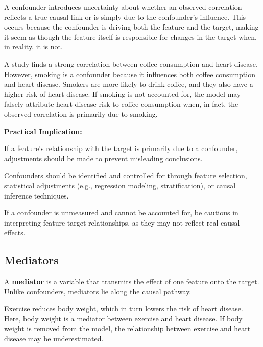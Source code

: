 \documentclass[12pt,openany, draft]{book}
\begin{document}
A confounder introduces uncertainty about whether an observed correlation reflects a true causal link or is simply due to the confounder’s influence. This occurs because the confounder is driving both the feature and the target, making it seem as though the feature itself is responsible for changes in the target when, in reality, it is not.

\begin{examplebox}
A study finds a strong correlation between coffee consumption and heart disease. However, smoking is a confounder because it influences both coffee consumption and heart disease. Smokers are more likely to drink coffee, and they also have a higher risk of heart disease. If smoking is not accounted for, the model may falsely attribute heart disease risk to coffee consumption when, in fact, the observed correlation is primarily due to smoking.
\end{examplebox}

\textbf{Practical Implication:}

If a feature’s relationship with the target is primarily due to a confounder, adjustments should be made to prevent misleading conclusions.
\newline

Confounders should be identified and controlled for through feature selection, statistical adjustments (e.g., regression modeling, stratification), or causal inference techniques.
\newline

If a confounder is unmeasured and cannot be accounted for, be cautious in interpreting feature-target relationships, as they may not reflect real causal effects.

\subsection{Mediators}

A \textbf{mediator} is a variable that transmits the effect of one feature onto the target. Unlike confounders, mediators lie along the causal pathway.

\begin{examplebox}
Exercise reduces body weight, which in turn lowers the risk of heart disease. Here, body weight is a mediator between exercise and heart disease. If body weight is removed from the model, the relationship between exercise and heart disease may be underestimated.
\end{examplebox}
\end{document}
